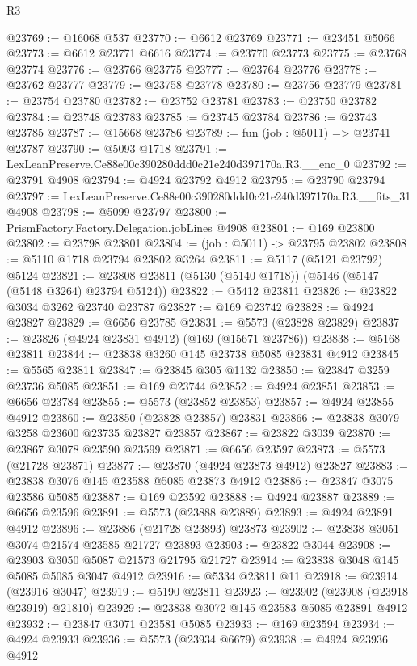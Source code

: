 \begin{lexlean}{R3}
\begin{coremodule}
@23769 := @16068 @537
@23770 := @6612 @23769
@23771 := @23451 @5066
@23773 := @6612 @23771 @6616
@23774 := @23770 @23773
@23775 := @23768 @23774
@23776 := @23766 @23775
@23777 := @23764 @23776
@23778 := @23762 @23777
@23779 := @23758 @23778
@23780 := @23756 @23779
@23781 := @23754 @23780
@23782 := @23752 @23781
@23783 := @23750 @23782
@23784 := @23748 @23783
@23785 := @23745 @23784
@23786 := @23743 @23785
@23787 := @15668 @23786
@23789 := fun (job : @5011) => @23741 @23787
@23790 := @5093 @1718
@23791 := LexLeanPreserve.Ce88e00c390280ddd0c21e240d397170a.R3.__enc_0
@23792 := @23791 @4908
@23794 := @4924 @23792 @4912
@23795 := @23790 @23794
@23797 := LexLeanPreserve.Ce88e00c390280ddd0c21e240d397170a.R3.__fits_31 @4908
@23798 := @5099 @23797
@23800 := PrismFactory.Factory.Delegation.jobLines @4908
@23801 := @169 @23800
@23802 := @23798 @23801
@23804 := (job : @5011) -> @23795 @23802
@23808 := @5110 @1718 @23794 @23802 @3264
@23811 := @5117 (@5121 @23792) @5124
@23821 := @23808 @23811 (@5130 (@5140 @1718)) (@5146 (@5147 (@5148 @3264) @23794 @5124))
@23822 := @5412 @23811
@23826 := @23822 @3034 @3262 @23740 @23787
@23827 := @169 @23742
@23828 := @4924 @23827
@23829 := @6656 @23785
@23831 := @5573 (@23828 @23829)
@23837 := @23826 (@4924 @23831 @4912) (@169 (@15671 @23786))
@23838 := @5168 @23811
@23844 := @23838 @3260 @145 @23738 @5085 @23831 @4912
@23845 := @5565 @23811
@23847 := @23845 @305 @1132
@23850 := @23847 @3259 @23736 @5085
@23851 := @169 @23744
@23852 := @4924 @23851
@23853 := @6656 @23784
@23855 := @5573 (@23852 @23853)
@23857 := @4924 @23855 @4912
@23860 := @23850 (@23828 @23857) @23831
@23866 := @23838 @3079 @3258 @23600 @23735 @23827 @23857
@23867 := @23822 @3039
@23870 := @23867 @3078 @23590 @23599
@23871 := @6656 @23597
@23873 := @5573 (@21728 @23871)
@23877 := @23870 (@4924 @23873 @4912) @23827
@23883 := @23838 @3076 @145 @23588 @5085 @23873 @4912
@23886 := @23847 @3075 @23586 @5085
@23887 := @169 @23592
@23888 := @4924 @23887
@23889 := @6656 @23596
@23891 := @5573 (@23888 @23889)
@23893 := @4924 @23891 @4912
@23896 := @23886 (@21728 @23893) @23873
@23902 := @23838 @3051 @3074 @21574 @23585 @21727 @23893
@23903 := @23822 @3044
@23908 := @23903 @3050 @5087 @21573 @21795 @21727
@23914 := @23838 @3048 @145 @5085 @5085 @3047 @4912
@23916 := @5334 @23811 @11
@23918 := @23914 (@23916 @3047)
@23919 := @5190 @23811
@23923 := @23902 (@23908 (@23918 @23919) @21810)
@23929 := @23838 @3072 @145 @23583 @5085 @23891 @4912
@23932 := @23847 @3071 @23581 @5085
@23933 := @169 @23594
@23934 := @4924 @23933
@23936 := @5573 (@23934 @6679)
@23938 := @4924 @23936 @4912

\end{coremodule}
\end{lexlean}
